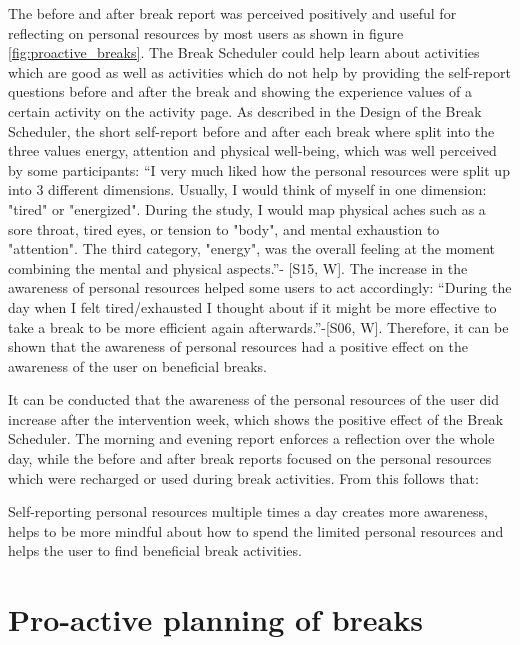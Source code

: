 \documentclass{hasel_thesis}
\begin{document}
The before and after break report was perceived positively and useful for reflecting on personal resources by most users as shown in figure
 \ref{fig:proactive_breaks}. The Break Scheduler could help learn about activities which are good as well as activities which do not help by providing the self-report questions before and after the break and showing the experience values of a certain activity on the activity page. As described in the Design of the Break Scheduler, the short self-report before and after each break where split into the three values energy, attention and physical well-being, which was well perceived by some participants: “I very much liked how the personal resources were split up into 3 different dimensions. Usually, I would think of myself in one dimension: "tired" or "energized". During the study, I would map physical aches such as a sore throat, tired eyes, or tension to "body", and mental exhaustion to "attention". The third category, "energy", was the overall feeling at the moment combining the mental and physical aspects.”- [S15, W]. The increase in the awareness of personal resources helped some users to act accordingly: “During the day when I felt tired/exhausted I thought about if it might be more effective to take a break to be more efficient again afterwards.”-[S06, W]. Therefore, it can be shown that the awareness of personal resources had a positive effect on the awareness of the user on beneficial breaks.

It can be conducted that the awareness of the personal resources of the user did increase after the intervention week, which shows the positive effect of the Break Scheduler. The morning and evening report enforces a reflection over the whole day, while the before and after break reports focused on the personal resources which were recharged or used during break activities. From this follows that:

\begin{tcolorbox}[colback=white!5!white,colframe=black!75!black]
  Self-reporting personal resources multiple times a day creates more awareness, helps to be more mindful about how to spend the limited personal resources and helps the user to find beneficial break activities. 
\end{tcolorbox}

\section{Pro-active planning of breaks} \label{planning_breaks}

\end{document}
